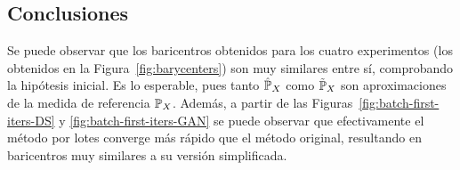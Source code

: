 

\subsection{Conclusiones}\label{ssec:sgdw-conclusiones}  %

Se puede observar que los baricentros obtenidos para los cuatro experimentos (los obtenidos en la Figura~\ref{fig:barycenters}) son muy similares entre sí, comprobando la hipótesis inicial. Es lo esperable, pues tanto $\hat\Prob_X$ como $\tilde\Prob_X$ son aproximaciones de la medida de referencia $\Prob_X$.  Además, a partir de las Figuras~\ref{fig:batch-first-iters-DS} y \ref{fig:batch-first-iters-GAN} se puede observar que efectivamente el método por lotes converge más rápido que el método original, resultando en baricentros muy similares a su versión simplificada.

